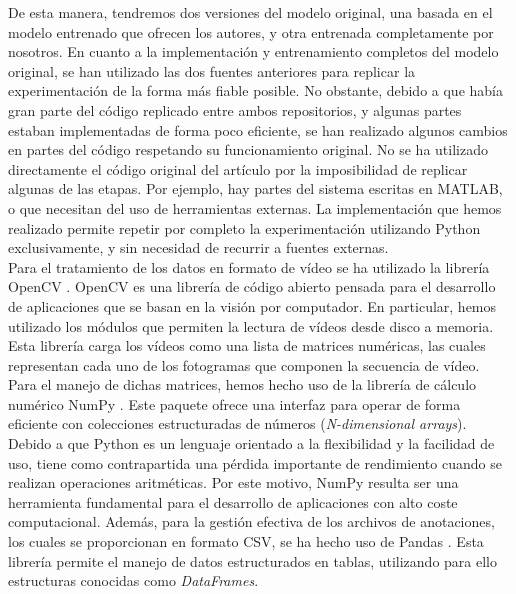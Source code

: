 \documentclass[../main.tex]{memoir}
\begin{document}
De esta manera, tendremos dos versiones del modelo original, una
basada en el modelo entrenado que ofrecen los autores, y otra
entrenada completamente por nosotros. En cuanto a la implementación y
entrenamiento completos del modelo original, se han utilizado las dos
fuentes anteriores para replicar la experimentación de la forma más
fiable posible. No obstante, debido a que había gran parte del código
replicado entre ambos repositorios, y algunas partes estaban
implementadas de forma poco eficiente, se han realizado algunos
cambios en partes del código respetando su funcionamiento original. No
se ha utilizado directamente el código original del artículo por la
imposibilidad de replicar algunas de las etapas. Por ejemplo, hay
partes del sistema escritas en MATLAB, o que necesitan del uso de
herramientas externas. La implementación que hemos realizado permite
repetir por completo la experimentación utilizando Python
exclusivamente, y sin necesidad de recurrir a fuentes externas.\\

Para el tratamiento de los datos en formato de vídeo se ha utilizado
la librería OpenCV \cite{bradski2000opencv}. OpenCV es una librería de
código abierto pensada para el desarrollo de aplicaciones que se basan
en la visión por computador. En particular, hemos utilizado los
módulos que permiten la lectura de vídeos desde disco a memoria. Esta
librería carga los vídeos como una lista de matrices numéricas, las
cuales representan cada uno de los fotogramas que componen la
secuencia de vídeo. Para el manejo de dichas matrices, hemos hecho uso
de la librería de cálculo numérico NumPy \cite{oliphant2006guide,
  van2011numpy}. Este paquete ofrece una interfaz para operar de forma
eficiente con colecciones estructuradas de números
(\textit{N-dimensional arrays}). Debido a que Python es un lenguaje
orientado a la flexibilidad y la facilidad de uso, tiene como
contrapartida una pérdida importante de rendimiento cuando se realizan
operaciones aritméticas. Por este motivo, NumPy resulta ser una
herramienta fundamental para el desarrollo de aplicaciones con alto
coste computacional. Además, para la gestión efectiva de los archivos
de anotaciones, los cuales se proporcionan en formato CSV, se ha hecho
uso de Pandas \cite{reback2020pandas}. Esta librería permite el manejo
de datos estructurados en tablas, utilizando para ello estructuras
conocidas como \textit{DataFrames}.\\
\end{document}
